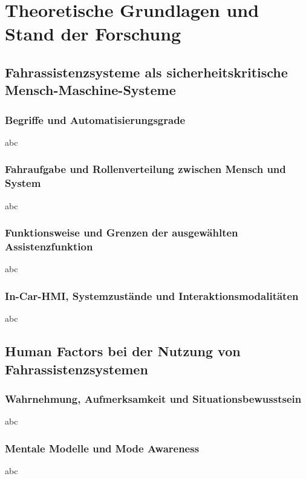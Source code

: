 \chapter{Theoretische Grundlagen und Stand der Forschung}
\label{chapter:related_work}


\section{Fahrassistenzsysteme als sicherheitskritische
Mensch-Maschine-Systeme}
\label{sec:fas_sicherheitskritisch}

\subsection{Begriffe und Automatisierungsgrade}
\label{subsec:begriffe_automatisierung}
abc

\subsection{Fahraufgabe und Rollenverteilung zwischen Mensch und System}
\label{subsec:fahraufgabe_rollenverteilung}
abc

\subsection{Funktionsweise und Grenzen der ausgewählten Assistenzfunktion}
\label{subsec:ausgewaehlte_assistenzfunktion}
abc

\subsection{In-Car-HMI, Systemzustände und Interaktionsmodalitäten}
\label{subsec:incar_hmi}
abc


\section{Human Factors bei der Nutzung von Fahrassistenzsystemen}
\label{sec:human_factors}

\subsection{Wahrnehmung, Aufmerksamkeit und Situationsbewusstsein}
\label{subsec:wahrnehmung_situationsbewusstsein}
abc

\subsection{Mentale Modelle und Mode Awareness}
\label{subsec:mentale_modelle}
abc

